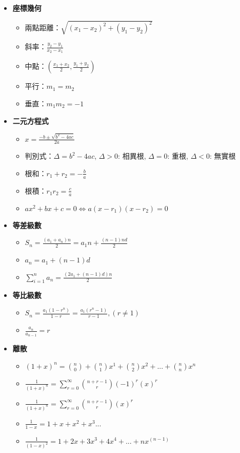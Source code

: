 \begin{itemize}
  \item \textbf{座標幾何}
  \begin{itemize}
    \item 兩點距離：$\sqrt{(x_1-x_2)^2+(y_1-y_2)^2}$
    \item 斜率：$\frac{y_2-y_1}{x_2-x_1}$
    \item 中點：$\left(\frac{x_1+x_2}{2}, \frac{y_1+y_2}{2}\right)$
    \item 平行：$m_1 = m_2$
    \item 垂直：$m_1 m_2 = -1$
  \end{itemize}

  \item \textbf{二元方程式}
  \begin{itemize}
    \item $x = \frac{-b \pm \sqrt{b^2-4ac}}{2a}$
    \item 判別式：$\Delta = b^2-4ac$, $\Delta >0$: 相異根, $\Delta =0$: 重根, $\Delta <0$: 無實根
    \item 根和：$r_1+r_2 = -\frac{b}{a}$
    \item 根積：$r_1 r_2 = \frac{c}{a}$
    \item $ax^2+bx+c=0 \Leftrightarrow a(x-r_1)(x-r_2)=0$
  \end{itemize}
  
  
  \item \textbf{等差級數}
  \begin{itemize}
    \item $S_n = \frac{(a_1 + a_n)n}{2} = a_1n + \frac{(n-1)nd}{2}$
    \item $a_n = a_1 + (n-1)d$
    \item $\sum \limits_{i=1}^n a_n = \frac{(2a_1+(n-1)d)n}{2}$
  \end{itemize}
  
  \item \textbf{等比級數}
  \begin{itemize}
    \item $S_n = \frac{a_1(1-r^n)}{1-r} = \frac{a_1(r^n-1)}{r-1}, (r \neq 1)$
    \item $\frac{a_n}{a_{n-1}} = r$
  \end{itemize}

  \item \textbf{離散}
  \begin{itemize}
    \item $(1+x)^n = \binom{n}{0} + \binom{n}{1}x^1 + \binom{n}{2}x^2 + ... + \binom{n}{n}x^n$
    \item $\frac{1}{(1+x)^n} = \sum \limits_{r=0}^\infty \binom{n+r-1}{r}(-1)^r(x)^r$
    \item $\frac{1}{(1+x)^n} = \sum \limits_{r=0}^\infty \binom{n+r-1}{r}(x)^r$
    \item $\frac{1}{1-x} = 1+x+x^2+x^3...$
    \item $\frac{1}{(1-x)^2} = 1+2x+3x^3+4x^4+...+nx^(n-1)$
  \end{itemize}


\end{itemize}
